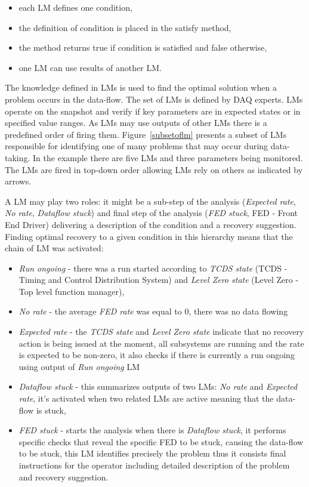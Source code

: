 \documentclass[a4paper]{jpconf}
\begin{document}
\begin{itemize}
\itemsep0em
\item each LM defines one condition,
\item the definition of condition is placed in the satisfy method,
\item the method returns true if condition is satisfied and false otherwise,
\item one LM can use results of another LM.
\end{itemize}

The knowledge defined in LMs is used to find the optimal solution when a problem occurs in the data-flow. The set of LMs is defined by DAQ experts. LMs operate on the snapshot and verify if key parameters are in expected states or in specified value ranges. As LMs may use outputs of other LMs there is a predefined order of firing them. Figure~\ref{subsetoflm} presents a subset of LMs responsible for identifying one of many problems that may occur during data-taking. In the example there are five LMs and three parameters being monitored. The LMs are fired in top-down order allowing LMs rely on others as indicated by arrows.


A LM may play two roles: it might be a sub-step of the analysis ({\it Expected rate}, {\it No rate}, {\it Dataflow stuck}) and final step of the analysis ({\it FED stuck}, FED - Front End Driver) delivering a description of the condition and a recovery suggestion. Finding optimal recovery to a given condition in this hierarchy means that the chain of LM was activated:

\begin{itemize}
\item {\it Run ongoing} -  there was a run started according to{ \it TCDS state} (TCDS - Timing and Control Distribution System) and{ \it Level Zero state} (Level Zero - Top level function manager),
\item{\it No rate} - the average {\it FED rate} was equal to 0, there was no data flowing
\item{\it Expected rate} - the {\it TCDS state}  and {\it Level Zero state} indicate that no recovery action is being issued at the moment, all subsystems are running and the rate is expected to be non-zero, it also checks if there is currently a run ongoing using output of {\it Run ongoing} LM
\item {\it Dataflow stuck} - this summarizes outputs of two LMs: {\it No rate} and {\it Expected rate}, it's activated when two related LMs are active meaning that the data-flow is stuck,
\item {\it FED stuck} - starts the analysis when there is {\it Dataflow stuck}, it performs specific checks that reveal the specific FED to be stuck, causing the data-flow to be stuck, this LM identifies precisely the problem thus it consists final instructions for the operator including detailed description of the problem and recovery suggestion.
\end{itemize}
\end{document}
